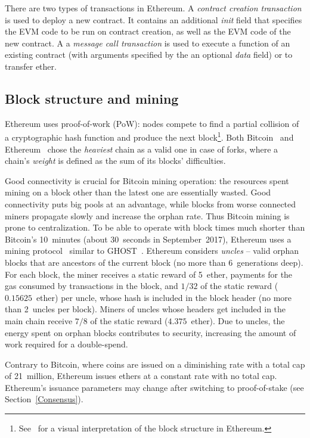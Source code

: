 There are two types of transactions in Ethereum.
A \emph{contract creation transaction} is used to deploy a new contract.
It contains an additional \emph{init} field that specifies the EVM code to be run on contract creation, as well as the EVM code of the new contract.
A a \emph{message call transaction} is used to execute a function of an existing contract (with arguments specified by the an optional \emph{data} field) or to transfer ether.


\subsection{Block structure and mining}
Ethereum uses proof-of-work (PoW): nodes compete to find a partial collision of a cryptographic hash function and produce the next block\footnote{See~\cite{atomh33ls16} for a visual interpretation of the block structure in Ethereum.}.
Both Bitcoin~\cite{Wuille2017} and Ethereum~\cite{Johnson2017} chose the \textit{heaviest} chain as a valid one in case of forks, where a chain's \textit{weight} is defined as the sum of its blocks' difficulties.

Good connectivity is crucial for Bitcoin mining operation: the resources spent mining on a block other than the latest one are essentially wasted.
Good connectivity puts big pools at an advantage, while blocks from worse connected miners propagate slowly and increase the orphan rate.
Thus Bitcoin mining is prone to centralization.
To be able to operate with block times much shorter than Bitcoin's 10~minutes (about 30~seconds in September~2017), Ethereum uses a mining protocol~\cite{EthdocsMining} similar to GHOST~\cite{Sompolinsky2013}.
Ethereum considers \emph{uncles} -- valid orphan blocks that are ancestors of the current block (no more than 6~generations deep).
For each block, the miner receives a static reward of 5~ether, payments for the gas consumed by transactions in the block, and $1/32$ of the static reward ($0.15625$~ether) per uncle, whose hash is included in the block header (no more than 2~uncles per block).
Miners of uncles whose headers get included in the main chain receive $7/8$ of the static reward ($4.375$~ether).
Due to uncles, the energy spent on orphan blocks contributes to security, increasing the amount of work required for a double-spend.

Contrary to Bitcoin, where coins are issued on a diminishing rate with a total cap of 21~million, Ethereum issues ethers at a constant rate with no total cap.
Ethereum's issuance parameters may change after switching to proof-of-stake (see Section~\ref{Consensus}).

